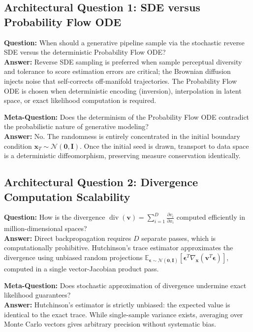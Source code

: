 \documentclass[11pt,a4paper]{article}
\theoremstyle{definition}
\begin{document}
\subsection{Architectural Question 1: SDE versus Probability Flow ODE}
\textbf{Question:} When should a generative pipeline sample via the stochastic reverse SDE versus the deterministic Probability Flow ODE?\\
\textbf{Answer:} Reverse SDE sampling is preferred when sample perceptual diversity and tolerance to score estimation errors are critical; the Brownian diffusion injects noise that self-corrects off-manifold trajectories. The Probability Flow ODE is chosen when deterministic encoding (inversion), interpolation in latent space, or exact likelihood computation is required.

\textbf{Meta-Question:} Does the determinism of the Probability Flow ODE contradict the probabilistic nature of generative modeling?\\
\textbf{Answer:} No. The randomness is entirely concentrated in the initial boundary condition $\mathbf{x}_T \sim \mathcal{N}(\mathbf{0}, \mathbf{I})$. Once the initial seed is drawn, transport to data space is a deterministic diffeomorphism, preserving measure conservation identically.

\subsection{Architectural Question 2: Divergence Computation Scalability}
\textbf{Question:} How is the divergence $\operatorname{div}(\mathbf{v}) = \sum_{i=1}^D \frac{\partial v_i}{\partial x_i}$ computed efficiently in million-dimensional spaces?\\
\textbf{Answer:} Direct backpropagation requires $D$ separate passes, which is computationally prohibitive. Hutchinson's trace estimator approximates the divergence using unbiased random projections $\mathbb{E}_{\boldsymbol{\epsilon} \sim \mathcal{N}(\mathbf{0}, \mathbf{I})}[\boldsymbol{\epsilon}^T \nabla_\mathbf{x} (\mathbf{v}^T \boldsymbol{\epsilon})]$, computed in a single vector-Jacobian product pass.

\textbf{Meta-Question:} Does stochastic approximation of divergence undermine exact likelihood guarantees?\\
\textbf{Answer:} Hutchinson's estimator is strictly unbiased: the expected value is identical to the exact trace. While single-sample variance exists, averaging over Monte Carlo vectors gives arbitrary precision without systematic bias.
\end{document}
